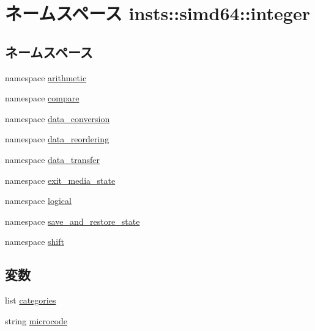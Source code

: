 \hypertarget{namespaceinsts_1_1simd64_1_1integer}{
\section{ネームスペース insts::simd64::integer}
\label{namespaceinsts_1_1simd64_1_1integer}
}
\subsection*{ネームスペース}
\begin{DoxyCompactItemize}
\item 
namespace \hyperlink{namespaceinsts_1_1simd64_1_1integer_1_1arithmetic}{arithmetic}
\item 
namespace \hyperlink{namespaceinsts_1_1simd64_1_1integer_1_1compare}{compare}
\item 
namespace \hyperlink{namespaceinsts_1_1simd64_1_1integer_1_1data__conversion}{data\_\-conversion}
\item 
namespace \hyperlink{namespaceinsts_1_1simd64_1_1integer_1_1data__reordering}{data\_\-reordering}
\item 
namespace \hyperlink{namespaceinsts_1_1simd64_1_1integer_1_1data__transfer}{data\_\-transfer}
\item 
namespace \hyperlink{namespaceinsts_1_1simd64_1_1integer_1_1exit__media__state}{exit\_\-media\_\-state}
\item 
namespace \hyperlink{namespaceinsts_1_1simd64_1_1integer_1_1logical}{logical}
\item 
namespace \hyperlink{namespaceinsts_1_1simd64_1_1integer_1_1save__and__restore__state}{save\_\-and\_\-restore\_\-state}
\item 
namespace \hyperlink{namespaceinsts_1_1simd64_1_1integer_1_1shift}{shift}
\end{DoxyCompactItemize}
\subsection*{変数}
\begin{DoxyCompactItemize}
\item 
list \hyperlink{namespaceinsts_1_1simd64_1_1integer_a273cf0f1630af14c1582f05e53354a55}{categories}
\item 
string \hyperlink{namespaceinsts_1_1simd64_1_1integer_a770f11a173e99389a8802f0107ed8f52}{microcode}
\end{DoxyCompactItemize}


